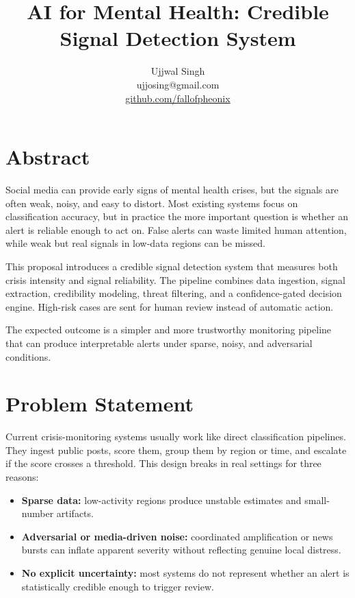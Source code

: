 \documentclass[11pt,a4paper]{article}
\title{\textbf{AI for Mental Health: Credible Signal Detection System}}
\author{Ujjwal Singh \\ \small ujjosing@gmail.com \\ \small \href{https://github.com/fallofpheonix}{github.com/fallofpheonix}}
\date{}
\begin{document}
\maketitle

\section{Abstract}

Social media can provide early signs of mental health crises, but the signals are often weak, noisy, and easy to distort. Most existing systems focus on classification accuracy, but in practice the more important question is whether an alert is reliable enough to act on. False alerts can waste limited human attention, while weak but real signals in low-data regions can be missed.

This proposal introduces a credible signal detection system that measures both crisis intensity and signal reliability. The pipeline combines data ingestion, signal extraction, credibility modeling, threat filtering, and a confidence-gated decision engine. High-risk cases are sent for human review instead of automatic action.

The expected outcome is a simpler and more trustworthy monitoring pipeline that can produce interpretable alerts under sparse, noisy, and adversarial conditions.

\section{Problem Statement}

Current crisis-monitoring systems usually work like direct classification pipelines. They ingest public posts, score them, group them by region or time, and escalate if the score crosses a threshold. This design breaks in real settings for three reasons:

\begin{itemize}
\item \textbf{Sparse data:} low-activity regions produce unstable estimates and small-number artifacts.
\item \textbf{Adversarial or media-driven noise:} coordinated amplification or news bursts can inflate apparent severity without reflecting genuine local distress.
\item \textbf{No explicit uncertainty:} most systems do not represent whether an alert is statistically credible enough to trigger review.
\end{itemize}
\end{document}
